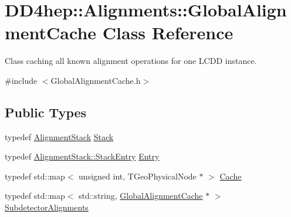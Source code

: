 \hypertarget{class_d_d4hep_1_1_alignments_1_1_global_alignment_cache}{}\section{D\+D4hep\+:\+:Alignments\+:\+:Global\+Alignment\+Cache Class Reference}
\label{class_d_d4hep_1_1_alignments_1_1_global_alignment_cache}


Class caching all known alignment operations for one L\+C\+DD instance.  




{\ttfamily \#include $<$Global\+Alignment\+Cache.\+h$>$}

\subsection*{Public Types}
\begin{DoxyCompactItemize}
\item 
typedef \hyperlink{class_d_d4hep_1_1_alignments_1_1_alignment_stack}{Alignment\+Stack} \hyperlink{class_d_d4hep_1_1_alignments_1_1_global_alignment_cache_a789078b02081705b1f31774ae040523e}{Stack}
\item 
typedef \hyperlink{struct_d_d4hep_1_1_alignments_1_1_alignment_stack_1_1_stack_entry}{Alignment\+Stack\+::\+Stack\+Entry} \hyperlink{class_d_d4hep_1_1_alignments_1_1_global_alignment_cache_a57c878d71fabf28ccab5c04f45f48fb1}{Entry}
\item 
typedef std\+::map$<$ unsigned int, T\+Geo\+Physical\+Node $\ast$ $>$ \hyperlink{class_d_d4hep_1_1_alignments_1_1_global_alignment_cache_a51cc6e8b7d9d85cfc296e8db7f360604}{Cache}
\item 
typedef std\+::map$<$ std\+::string, \hyperlink{class_d_d4hep_1_1_alignments_1_1_global_alignment_cache}{Global\+Alignment\+Cache} $\ast$ $>$ \hyperlink{class_d_d4hep_1_1_alignments_1_1_global_alignment_cache_abedb85cf969b8fb161695f5eca9717bc}{Subdetector\+Alignments}
\end{DoxyCompactItemize}

